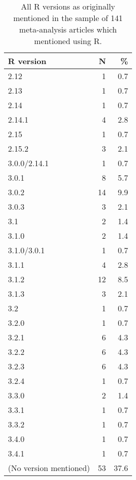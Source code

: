 \begin{table}[ht]
\centering
\begin{tabular}{lrr}
  \hline
R version & N & \% \\ 
  \hline
2.12 & 1 & 0.7 \\ 
  2.13 & 1 & 0.7 \\ 
  2.14 & 1 & 0.7 \\ 
  2.14.1 & 4 & 2.8 \\ 
  2.15 & 1 & 0.7 \\ 
  2.15.2 & 3 & 2.1 \\ 
  3.0.0/2.14.1 & 1 & 0.7 \\ 
  3.0.1 & 8 & 5.7 \\ 
  3.0.2 & 14 & 9.9 \\ 
  3.0.3 & 3 & 2.1 \\ 
  3.1 & 2 & 1.4 \\ 
  3.1.0 & 2 & 1.4 \\ 
  3.1.0/3.0.1 & 1 & 0.7 \\ 
  3.1.1 & 4 & 2.8 \\ 
  3.1.2 & 12 & 8.5 \\ 
  3.1.3 & 3 & 2.1 \\ 
  3.2 & 1 & 0.7 \\ 
  3.2.0 & 1 & 0.7 \\ 
  3.2.1 & 6 & 4.3 \\ 
  3.2.2 & 6 & 4.3 \\ 
  3.2.3 & 6 & 4.3 \\ 
  3.2.4 & 1 & 0.7 \\ 
  3.3.0 & 2 & 1.4 \\ 
  3.3.1 & 1 & 0.7 \\ 
  3.3.2 & 1 & 0.7 \\ 
  3.4.0 & 1 & 0.7 \\ 
  3.4.1 & 1 & 0.7 \\ 
  (No version mentioned) & 53 & 37.6 \\ 
   \hline
\end{tabular}
\caption{All R versions as originally mentioned in the sample of 141 meta-analysis articles which mentioned using R.} 
\label{tab:app_ma_res_all_rvers_mentions}
\end{table}
